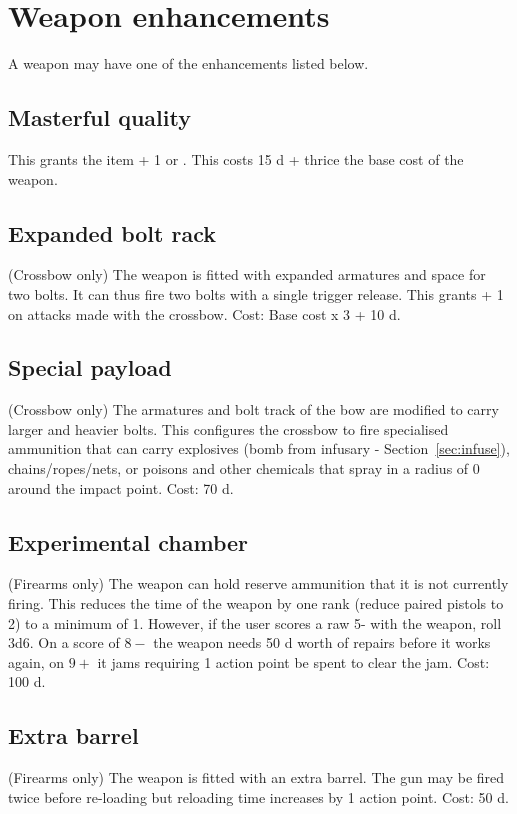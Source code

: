 \documentclass[a4paper,11pt,oneside]{book}
\newcommand{\textlf}[1]{\textbf{\titlecap{#1}}}
\begin{document}
\section{Weapon enhancements}
A weapon may have one of the enhancements listed below. 

\subsection{Masterful quality}
This grants the item + 1 \textlf{Power} or \textlf{aim}. This costs 15 d + thrice the base cost of the weapon.

\subsection{Expanded bolt rack}
(Crossbow only) The weapon is fitted with expanded armatures and space for two bolts. It can thus fire two bolts with a single trigger release. This grants \textlf{Burst} + 1 on attacks made with the crossbow. Cost: Base cost x 3 + 10 d. 

\subsection{Special payload}
(Crossbow only) The armatures and bolt track of the bow are modified to carry larger and heavier bolts. This configures the crossbow to fire specialised ammunition that can carry explosives (bomb from infusary - Section~\ref{sec:infuse}), chains/ropes/nets, or poisons and other chemicals that spray in a radius of 0 around the impact point. Cost: 70 d.

\subsection{Experimental chamber}
(Firearms only) The weapon can hold reserve ammunition that it is not currently firing. This reduces the \textlf{Reload} time of the weapon by one rank (reduce paired pistols to \textlf{Reload} 2) to a minimum of 1. However, if the user scores a raw 5- with the weapon, roll 3d6. On a score of $8-$ the weapon needs 50 d worth of repairs before it works again, on $9+$ it jams requiring 1 action point be spent to clear the jam. Cost: 100 d.

\subsection{Extra barrel}
(Firearms only) The weapon is fitted with an extra barrel. The gun may be fired twice before re-loading but reloading time increases by 1 action point. Cost: 50 d.
\end{document}
